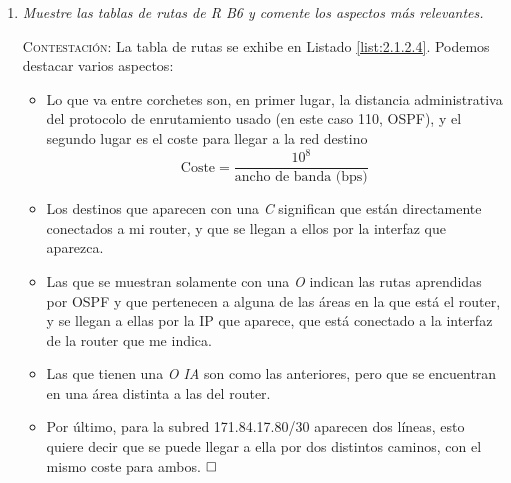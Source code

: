 \documentclass[twoside, 11pt]{article}
\begin{document}
\begin{enumerate}
\begin{center}
\begin{verbatim}
Router#sh ip protocols 

Routing Protocol is "ospf 100"
  Outgoing update filter list for all interfaces is not set 
  Incoming update filter list for all interfaces is not set 
  Router ID 171.84.17.138
  Number of areas in this router is 3. 3 normal 0 stub 0 nssa
  Maximum path: 4
  Routing for Networks:
    171.84.16.128 0.0.0.63 area 2
    171.84.17.80 0.0.0.3 area 3
    171.84.17.84 0.0.0.3 area 3
    171.84.17.136 0.0.0.3 area 0
    171.84.17.132 0.0.0.3 area 0
  Routing Information Sources:  
    Gateway         Distance      Last Update 
    171.84.16.254        110      00:13:51
    171.84.17.89         110      00:14:26
    171.84.17.90         110      00:14:21
    171.84.17.137        110      00:14:25
    171.84.17.138        110      00:14:26
    172.84.18.226        110      00:14:25
  Distance: (default is 110)
\end{verbatim}
\label{list:2.1.2.3.3}
\end{center}

\item \textit{Muestre las tablas de rutas de R B6 y comente los aspectos más relevantes.}
\label{ej:2.1.2.4}

\vspace{7px}

\textsc{Contestación}: La tabla de rutas se exhibe en Listado \ref{list:2.1.2.4}. Podemos destacar varios aspectos: 

\begin{itemize}
    \item[-] Lo que va entre corchetes son, en primer lugar, la distancia administrativa del protocolo de enrutamiento usado (en este caso 110, OSPF), y el segundo lugar es el coste para llegar a la red destino \[\text{Coste} = \frac{10^8}{\text{ancho de banda (bps)}}\]
    \item[-] Los destinos que aparecen con una \textit{C} significan que están directamente conectados a mi router, y que se llegan a ellos por la interfaz que aparezca.
    \item[-] Las que se muestran solamente con una \textit{O} indican las rutas aprendidas por OSPF y que pertenecen a alguna de las áreas en la que está el router, y se llegan a ellas por la IP que aparece, que está conectado a la interfaz de la router que me indica.
    \item[-] Las que tienen una \textit{O IA} son como las anteriores, pero que se encuentran en una área distinta a las del router.
    \item[-] Por último, para la subred 171.84.17.80/30 aparecen dos líneas, esto quiere decir que se puede llegar a ella por dos distintos caminos, con el mismo coste para ambos. $\hfill\square$
\end{itemize}


\end{enumerate}
\end{document}
